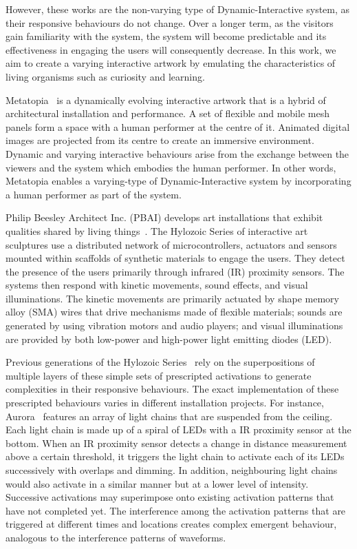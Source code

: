 However, these works are the non-varying type of Dynamic-Interactive system, as their responsive behaviours do not change. Over a longer term, as the visitors gain familiarity with the system, the system will become predictable and its effectiveness in engaging the users will consequently decrease. In this work, we aim to create a varying interactive artwork by emulating the characteristics of living organisms such as curiosity and learning. 

Metatopia~\cite{Metabody2014} is a dynamically evolving interactive artwork that is a hybrid of architectural installation and performance. A set of flexible and mobile mesh panels form a space with a human performer at the centre of it. Animated digital images are projected from its centre to create an immersive environment. Dynamic and varying interactive behaviours arise from the exchange between the viewers and the system which embodies the human performer. In other words, Metatopia enables a varying-type of Dynamic-Interactive system by incorporating a human performer as part of the system.

Philip Beesley Architect Inc. (PBAI) develops art installations that exhibit qualities shared by living things~\cite{Gorbet2015}. The Hylozoic Series of interactive art sculptures use a distributed network of microcontrollers, actuators and sensors mounted within scaffolds of synthetic materials to engage the users. They detect the presence of the users primarily through infrared (IR) proximity sensors. The systems then respond with kinetic movements, sound effects, and visual illuminations. The kinetic movements are primarily actuated by shape memory alloy (SMA) wires that drive mechanisms made of flexible materials; sounds are generated by using vibration motors and audio players; and visual illuminations are provided by both low-power and high-power light emitting diodes (LED). 

Previous generations of the Hylozoic Series~\cite{Beesley2012} rely on the superpositions of multiple layers of these simple sets of prescripted activations to generate complexities in their responsive behaviours. The exact implementation of these prescripted behaviours varies in different installation projects. For instance, Aurora~\cite{PBAI-Simon} features an array of light chains that are suspended from the ceiling. Each light chain is made up of a spiral of LEDs with a IR proximity sensor at the bottom. When an IR proximity sensor detects a change in distance measurement above a certain threshold, it triggers the light chain to activate each of its LEDs successively with overlaps and dimming. In addition, neighbouring light chains would also activate in a similar manner but at a lower level of intensity. Successive activations may superimpose onto existing activation patterns that have not completed yet. The interference among the activation patterns that are triggered at different times and locations creates complex emergent behaviour, analogous to the interference patterns of waveforms. 

